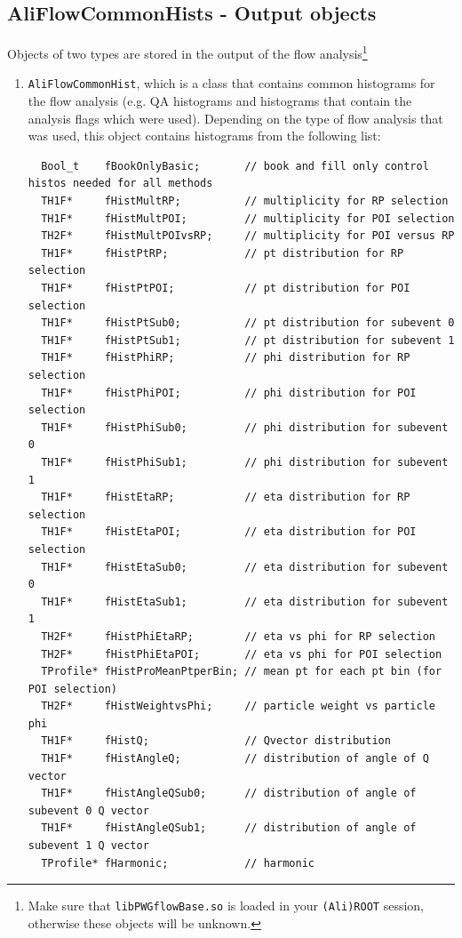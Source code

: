 \documentclass[a4paper]{book}
\numberwithin{equation}{subsection}
\begin{document}
\subsection{AliFlowCommonHists - Output objects}
Objects of two types are stored in the output of the flow analysis\footnote{Make sure that \texttt{libPWGflowBase.so} is loaded in your \texttt{(Ali)ROOT} session, otherwise these objects will be unknown.}
\begin{enumerate}
\item \texttt{AliFlowCommonHist}, which is a class that contains common histograms for the flow analysis (e.g. QA histograms and histograms that contain the analysis flags which were used). Depending on the type of flow analysis that was used, this object contains histograms from the following list:
\begin{lstlisting}
  Bool_t    fBookOnlyBasic;       // book and fill only control histos needed for all methods
  TH1F*     fHistMultRP;          // multiplicity for RP selection
  TH1F*     fHistMultPOI;         // multiplicity for POI selection
  TH2F*     fHistMultPOIvsRP;     // multiplicity for POI versus RP
  TH1F*     fHistPtRP;            // pt distribution for RP selection
  TH1F*     fHistPtPOI;           // pt distribution for POI selection
  TH1F*     fHistPtSub0;          // pt distribution for subevent 0
  TH1F*     fHistPtSub1;          // pt distribution for subevent 1
  TH1F*     fHistPhiRP;           // phi distribution for RP selection
  TH1F*     fHistPhiPOI;          // phi distribution for POI selection
  TH1F*     fHistPhiSub0;         // phi distribution for subevent 0
  TH1F*     fHistPhiSub1;         // phi distribution for subevent 1
  TH1F*     fHistEtaRP;           // eta distribution for RP selection
  TH1F*     fHistEtaPOI;          // eta distribution for POI selection
  TH1F*     fHistEtaSub0;         // eta distribution for subevent 0
  TH1F*     fHistEtaSub1;         // eta distribution for subevent 1
  TH2F*     fHistPhiEtaRP;        // eta vs phi for RP selection
  TH2F*     fHistPhiEtaPOI;       // eta vs phi for POI selection
  TProfile* fHistProMeanPtperBin; // mean pt for each pt bin (for POI selection)
  TH2F*     fHistWeightvsPhi;     // particle weight vs particle phi
  TH1F*     fHistQ;               // Qvector distribution
  TH1F*     fHistAngleQ;          // distribution of angle of Q vector
  TH1F*     fHistAngleQSub0;      // distribution of angle of subevent 0 Q vector
  TH1F*     fHistAngleQSub1;      // distribution of angle of subevent 1 Q vector
  TProfile* fHarmonic;            // harmonic 

\end{lstlisting}
\end{enumerate}
\end{document}
